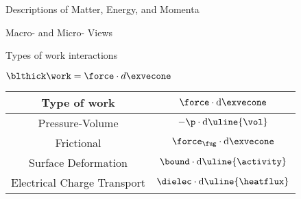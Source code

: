 \begin{bigmdframed}

    
\begin{listone}
    
    \item Descriptions of Matter, Energy, and Momenta
    
    \item Macro- and Micro- Views
    
\end{listone}

\centering
        
Types of work interactions
                
$\blthick\work = \force \cdot d\exvecone$
        
\bigskip
        
        
        
        
\begin{tabular}{ | c | c |  }
        
	\hline
            
	Type of work & $\force \cdot \mathrm{d}\exvecone$ \\
            
	\hline
            
	Pressure-Volume & $-\p \cdot \mathrm{d}\uline{\vol}$ \\
            
	\hline
            
	Frictional & $\force_{\fug} \cdot \mathrm{d}\exvecone$ \\
            
	\hline
            
	Surface Deformation & $\bound \cdot \mathrm{d}\uline{\activity}$ \\
            
	\hline                            %
            
	Electrical Charge Transport & $\dielec \cdot \mathrm{d}\uline{\heatflux}$ \\
            

\end{tabular}
\end{bigmdframed}
